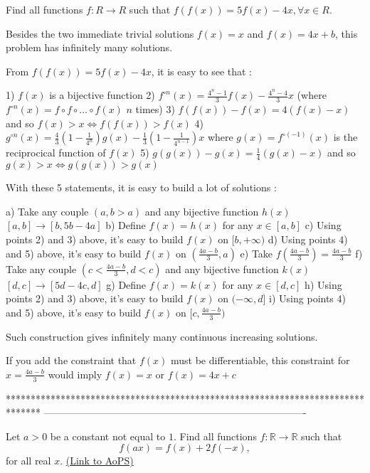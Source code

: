\begin{mysolution}
	\begin{tcolorbox}Find all functions $f: R\to R$ such that
$f(f(x))=5f(x)-4x,\forall x \in R.$\end{tcolorbox}

Besides the two immediate trivial solutions $f(x)=x$ and $f(x)=4x+b$, this problem has infinitely many solutions.

From $f(f(x))=5f(x)-4x$, it is easy to see that :

1) $f(x)$ is a bijective function
2) $f^{\circ n}(x)=\frac{4^{n}-1}{3}f(x)-\frac{4^{n}-4}{3}x$ (where $f^{\circ n}(x)=f\circ f\circ\ldots\circ f(x)$ $n$ times)
3) $f(f(x))-f(x)=4(f(x)-x)$ and so $f(x)>x\Leftrightarrow f(f(x))>f(x)$
4) $g^{\circ n}(x)=\frac{4}{3}(1-\frac{1}{4^{n}})g(x)-\frac{1}{3}(1-\frac{1}{4^{n-1}})x$ where $g(x)=f^{\circ(-1)}(x)$ is the reciprocical function of $f(x)$
5) $g(g(x))-g(x)=\frac{1}{4}(g(x)-x)$ and so $g(x)>x\Leftrightarrow g(g(x))>g(x)$

With these 5 statements, it is easy to build a lot of solutions :

a) Take any couple $(a,b>a)$ and any bijective function $h(x)$ $[a,b]\rightarrow [b,5b-4a]$
b) Define $f(x)=h(x)$ for any $x\in[a,b]$
c) Using points 2) and 3) above, it's easy to build $f(x)$ on $[b,+\infty)$
d) Using points 4) and 5) above, it's easy to build $f(x)$ on $(\frac{4a-b}{3},a)$
e) Take $f(\frac{4a-b}{3})=\frac{4a-b}{3}$
f) Take any couple $(c<\frac{4a-b}{3},d<c)$ and any bijective function $k(x)$ $[d,c]\rightarrow [5d-4c,d]$
g) Define $f(x)=k(x)$ for any $x\in[d,c]$
h) Using points 2) and 3) above, it's easy to build $f(x)$ on $(-\infty,d]$ 
i) Using points 4) and 5) above, it's easy to build $f(x)$ on $[c,\frac{4a-b}{3})$


Such construction gives infinitely many continuous increasing solutions.

If you add the constraint that $f(x)$ must be differentiable, this constraint for $x=\frac{4a-b}{3}$ would imply $f(x)=x$ or $f(x)=4x+c$
\end{mysolution}
*******************************************************************************
-------------------------------------------------------------------------------

\begin{problem}
	Let $a>0$ be a constant not equal to $1$. Find all functions $f: \mathbb R \to \mathbb R$ such that
\[f(ax)=f(x)+2f(-x),\]
for all real $x$.
	\flushright \href{https://artofproblemsolving.com/community/c6h153937}{(Link to AoPS)}
\end{problem}




